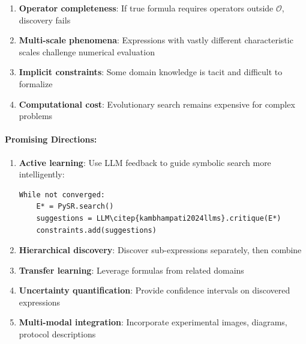 \documentclass[twoside,11pt]{article}
\begin{document}
\begin{enumerate}
\item \textbf{Operator completeness}: If true formula requires operators outside $\mathcal{O}$, discovery fails\citep{koza1994genetic}
\item \textbf{Multi-scale phenomena}: Expressions with vastly different characteristic scales challenge numerical evaluation
\item \textbf{Implicit constraints}: Some domain knowledge is tacit and difficult to formalize
\item \textbf{Computational cost}: Evolutionary search remains expensive for complex problems
\end{enumerate}

\paragraph{Promising Directions:}

\begin{enumerate}
\item \textbf{Active learning}: Use LLM feedback to guide symbolic search more intelligently:\citep{kambhampati2024llms}
\begin{verbatim}
While not converged:
    E* = PySR.search()
    suggestions = LLM\citep{kambhampati2024llms}.critique(E*)
    constraints.add(suggestions)
\end{verbatim}

\item \textbf{Hierarchical discovery}: Discover sub-expressions separately, then combine\citep{koza1994genetic}
\item \textbf{Transfer learning}: Leverage formulas from related domains
\item \textbf{Uncertainty quantification}: Provide confidence intervals on discovered expressions
\item \textbf{Multi-modal integration}: Incorporate experimental images, diagrams, protocol descriptions
\end{enumerate}
\end{document}
